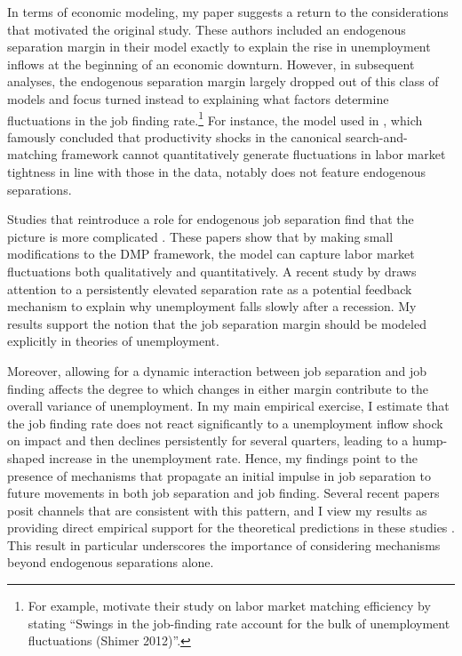 \documentclass[12pt]{article}
\begin{document}
In terms of economic modeling, my paper suggests a return to the considerations that motivated the original \cite{Mortensen:1994aa} study. These authors included an endogenous separation margin in their model exactly to explain the rise in unemployment inflows at the beginning of an economic downturn. However, in subsequent analyses, the endogenous separation margin largely dropped out of this class of models and focus turned instead to explaining what factors determine fluctuations in the job finding rate.\footnote{For example, \cite{Gavazza:2018aa} motivate their study on labor market matching efficiency by stating ``Swings in the job-finding rate account for the bulk of unemployment fluctuations (Shimer 2012)''.} For instance, the model used in \cite{Shimer:2005aa}, which famously concluded that productivity shocks in the canonical search-and-matching framework cannot quantitatively generate fluctuations in labor market tightness in line with those in the data, notably does not feature endogenous separations. 

Studies that reintroduce a role for endogenous job separation find that the picture is more complicated \citep{denHann:2000aa, Fujita:2012aa}. These papers show that by making small modifications to the DMP framework, the model can capture labor market fluctuations both qualitatively and quantitatively. A recent study by \cite{Hall:2022aa} draws attention to a persistently elevated separation rate as a potential feedback mechanism to explain why unemployment falls slowly after a recession. My results support the notion that the job separation margin should be modeled explicitly in theories of unemployment.

Moreover, allowing for a dynamic interaction between job separation and job finding affects the degree to which changes in either margin contribute to the overall variance of unemployment. In my main empirical exercise, I estimate that the job finding rate does not react significantly to a unemployment inflow shock on impact and then declines persistently for several quarters, leading to a hump-shaped increase in the unemployment rate. Hence, my findings point to the presence of mechanisms that propagate an initial impulse in job separation to future movements in both job separation and job finding. Several recent papers posit channels that are consistent with this pattern, and I view my results as providing direct empirical support for the theoretical predictions in these studies \citep{Coles:2018aa,Ahn:2020aa,Engbom:2021aa,Gregory:2025aa,Mercan:2024aa}. This result in particular underscores the importance of considering mechanisms beyond endogenous separations alone. 
\end{document}
